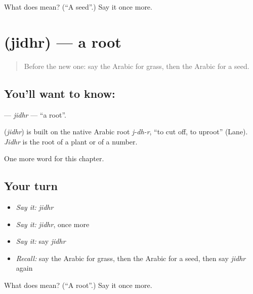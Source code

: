 \begin{tcolorbox}[breakable,colback=teal!4,colframe=teal!35!black,title={Before you move on}]
What does  mean? (\textquotedblleft{}A seed\textquotedblright{}.) Say it once more.
\end{tcolorbox}
\section[\texorpdfstring{\ar{جذر} (jidhr)}{جذر (jidhr)}]{ (jidhr) — a root}

\label{lesson:AR-C131-jidhr}



\begin{quote}
Before the new one: say the Arabic for grass, then the Arabic for a seed.
\end{quote}

\subsection*{You'll want to know: }
\textbf{} — \emph{jidhr} — \textquotedblleft{}a root\textquotedblright{}.

\begin{cousinweb}
\textbf{} (\emph{jidhr}) is built on the native Arabic root \emph{j-dh-r}, \textquotedblleft{}to cut off, to uproot\textquotedblright{} (Lane). \emph{Jidhr} is the root of a plant or of a number.
\end{cousinweb}

\begin{grammarlens}[title={What you've built}]
One more word for this chapter.
\end{grammarlens}

\subsection*{Your turn}
\begin{itemize}
\raggedright
  \item \emph{Say it:} \emph{jidhr}
  \item \emph{Say it:} \emph{jidhr}, once more
  \item \emph{Say it:} say \emph{jidhr}
  \item \emph{Recall:} say the Arabic for grass, then the Arabic for a seed, then say \emph{jidhr} again
\end{itemize}

\begin{tcolorbox}[breakable,colback=teal!4,colframe=teal!35!black,title={Before you move on}]
What does  mean? (\textquotedblleft{}A root\textquotedblright{}.) Say it once more.
\end{tcolorbox}
